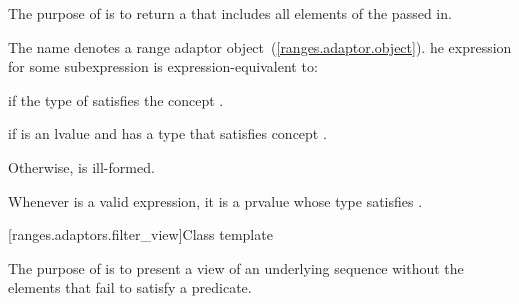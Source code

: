 \pnum
The purpose of  is to return a  that includes all
elements of the  passed in.

\pnum
The name  denotes a range adaptor
object~(\ref{ranges.adaptor.object}). he
expression  for some subexpression  is
expression-equivalent to:

\begin{itemize}
\item {} if the  type of 
satisfies the concept .
{\color{remclr}
\item {}}
\item {} if 
is an lvalue and has a type that satisfies concept .
\item Otherwise,  is ill-formed.
\end{itemize}

\begin{addedblock}
\remark Whenever  is a valid expression, it is a prvalue
whose type satisfies .
\end{addedblock}

[ranges.adaptors.filter_view]{Class template }

\pnum
The purpose of  is to present a view of an underlying
sequence without the elements that fail to satisfy a predicate.

\pnum
\enterexample
{}
\exitexample

